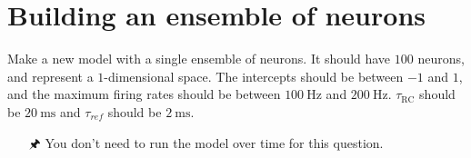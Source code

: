 %
%
%
%



\newcommand{\assignmentCourse}{SYDE 556/750}
\newcommand{\assignmentCourseName}{Simulating Neurobiological Systems}
\newcommand{\assignmentName}{Assignment 4}
\newcommand{\assignmentNo}{04}
\newcommand{\assignmentTerm}{Winter 2020}
\newcommand{\assignmentDue}{March 17, 2020}
\newcommand{\assignmentMarks}{10 marks (10\% of the final grade)}
\newcommand{\assignmentURL}{https://github.com/astoeckel/syde556-w20/blob/master/assignments/assignment_04/syde556_assignment_04_template.ipynb}
\newcommand{\assignmentEmail}{astoecke@uwaterloo.ca}
\newcommand{\assignmentExtraNotes}{\item \textbf{For this assignment, you must use \href{https://www.nengo.ai/getting-started/}{Nengo}}. Feel free to look through the examples folder and/or the tutorials on the Nengo website before doing this assignment.}


	\assignmentHeader

	\section{Building an ensemble of neurons}

	Make a new model with a single ensemble of neurons. It should have $100$ neurons, and represent a $1$-dimensional space. The intercepts should be between $-1$ and $1$, and the maximum firing rates should be between $\SI{100}{\hertz}$ and $\SI{200}{\hertz}$. $\tau_\mathrm{RC}$ should be $\SI{20}{\milli\second}$ and $\tau_{ref}$ should be $\SI{2}{\milli\second}$.

	\begin{itemize}
		\item[{\symbolfont 🖈}]  You don't need to run the model over time for this question.
	\end{itemize}

